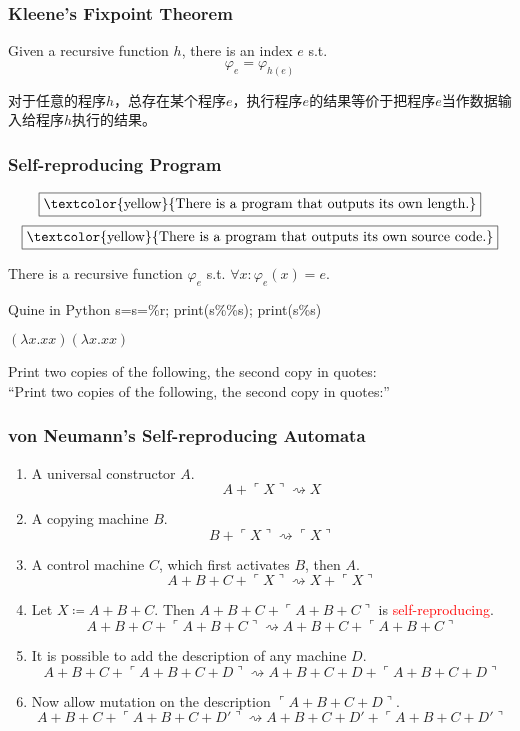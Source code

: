 \documentclass[UTF8,aspectratio=43,11pt,colorlinks,compress,openany]{beamer}%
\begin{document}
\begin{frame}\frametitle{Kleene's Fixpoint Theorem}
\setlength\abovedisplayskip{0pt}
\setlength\belowdisplayskip{0pt}
	\begin{theorem}
		Given a recursive function $h$, there is an index $e$ s.t.
		\[\varphi_e=\varphi_{h(e)}\]
	\end{theorem}
对于任意的程序$h$，总存在某个程序$e$，执行程序$e$的结果等价于把程序$e$当作数据输入给程序$h$执行的结果。
\end{frame}

\begin{frame}\frametitle{Self-reproducing Program}
	\[\fbox{\textcolor{yellow}{There is a program that outputs its own length.}}\]
	\[\fbox{\textcolor{yellow}{There is a program that outputs its own source code.}}\]
	\begin{corollary}
		There is a recursive function $\varphi_e$ s.t. $\forall x: \varphi_e(x)=e$.
	\end{corollary}
\begin{block}{Quine in Python}
s=\textquotesingle s=\%r; print(s\%\%s)\textquotesingle; print(s\%s)
\end{block}
\centerline{$(\lambda x.xx)(\lambda x.xx)$}
\begin{block}{}
	Print two copies of the following, the second copy in quotes:\\
	``Print two copies of the following, the second copy in quotes:''
\end{block}
	\centerline{\fbox{\textcolor{green}{DNA / mutation / evolution}}}
\end{frame}

\begin{frame}\frametitle{von Neumann's Self-reproducing Automata}
	\begin{enumerate}
		\item A universal constructor $A$.
		\[A+\ulcorner X\urcorner\rightsquigarrow X\]
		\item A copying machine $B$.
		\[B+\ulcorner X\urcorner\rightsquigarrow\ulcorner X\urcorner\]
		\item A control machine $C$, which first activates $B$, then $A$.
		\[A+B+C+\ulcorner X\urcorner\rightsquigarrow X+\ulcorner X\urcorner\]
		\item Let $X\coloneqq A+B+C$. {Then} $A+B+C+\ulcorner A+B+C\urcorner$ is \textcolor{red}{self-reproducing}.
		\[A+B+C+\ulcorner A+B+C\urcorner\rightsquigarrow A+B+C+\ulcorner A+B+C\urcorner\]
		\item It is possible to add the description of any machine $D$.
		\[A+B+C+\ulcorner A+B+C+D\urcorner\rightsquigarrow A+B+C+D+\ulcorner A+B+C+D\urcorner\]
		\item Now allow mutation on the description $\ulcorner A+B+C+D\urcorner$.
		\[A+B+C+\ulcorner A+B+C+D'\urcorner\rightsquigarrow A+B+C+D'+\ulcorner A+B+C+D'\urcorner\]
	\end{enumerate}
\end{frame}
\end{document}
